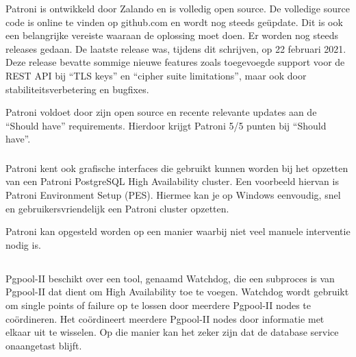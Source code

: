 Patroni is ontwikkeld door Zalando en is volledig open source. De volledige source code is online te vinden op github.com en wordt nog steeds geüpdate. Dit is ook een belangrijke vereiste waaraan de oplossing moet doen. Er worden  nog steeds releases gedaan. De laatste release was, tijdens dit schrijven, op 22 februari 2021. Deze release bevatte sommige nieuwe features zoals toegevoegde support voor de REST API bij “TLS keys” en “cipher suite limitations”, maar ook door stabiliteitsverbetering en bugfixes.

Patroni voldoet door zijn open source en recente relevante updates aan de “Should have” requirements. Hierdoor krijgt Patroni 5/5 punten bij “Should have”.

\subsubsection{}
\label{subsubsec:Could have}

Patroni kent ook grafische interfaces die gebruikt kunnen worden bij het opzetten van een Patroni PostgreSQL High Availability cluster. Een voorbeeld hiervan is Patroni Environment Setup (PES). Hiermee kan je op Windows eenvoudig, snel en gebruikersvriendelijk een Patroni cluster opzetten.

Patroni kan opgesteld worden op een manier waarbij niet veel manuele interventie nodig is.



\subsection{}
\label{subsec: Oplossing 2: Pgpool-II}

\subsubsection{}
\label{subsubsec:Must have}

Pgpool-II beschikt over een tool, genaamd Watchdog, die een subproces is van Pgpool-II dat dient om High Availability toe te voegen. Watchdog wordt gebruikt om single points of failure op te lossen door meerdere Pgpool-II nodes te coördineren. Het coördineert meerdere Pgpool-II nodes door informatie met elkaar uit te wisselen. Op die manier kan het zeker zijn dat de database service onaangetast blijft.

